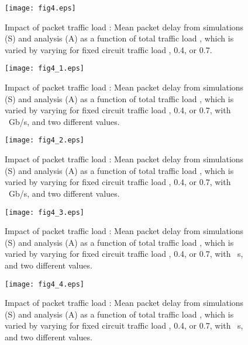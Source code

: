 \documentclass[article]{IEEEtran}
\begin{document}
\begin{figure}[t]
\begin{center}
\texttt{[image: fig4.eps]}
\end{center}
\caption{Impact of packet traffic load :
Mean packet delay  from simulations (S) and
analysis (A) as a function of total traffic load ,
which is varied by varying  for fixed
circuit traffic load , 0.4, or 0.7.}
\label{fig:pi}
\end{figure}
\begin{figure}[t]
\begin{center}
\texttt{[image: fig4\_1.eps]}
\end{center}
\caption{Impact of packet traffic load :
Mean packet delay  from simulations (S) and
analysis (A) as a function of total traffic load ,
which is varied by varying  for fixed
circuit traffic load , 0.4, or 0.7,
with ~Gb/s, and two different  values.}
\label{fig:pi1}
\end{figure}
\begin{figure}[t]
\begin{center}
\texttt{[image: fig4\_2.eps]}
\end{center}
\caption{Impact of packet traffic load :
Mean packet delay  from simulations (S) and
analysis (A) as a function of total traffic load ,
which is varied by varying  for fixed
circuit traffic load , 0.4, or 0.7,
with ~Gb/s, and two different  values.}
\label{fig:pi2}
\end{figure}
\begin{figure}[t]
\begin{center}
\texttt{[image: fig4\_3.eps]}
\end{center}
\caption{Impact of packet traffic load :
Mean packet delay  from simulations (S) and
analysis (A) as a function of total traffic load ,
which is varied by varying  for fixed
circuit traffic load , 0.4, or 0.7,
with ~s, and two different  values.}
\label{fig:pi3}
\end{figure}
\begin{figure}[t]
\begin{center}
\texttt{[image: fig4\_4.eps]}
\end{center}
\caption{Impact of packet traffic load :
Mean packet delay  from simulations (S) and
analysis (A) as a function of total traffic load ,
which is varied by varying  for fixed
circuit traffic load , 0.4, or 0.7,
with ~s, and two different  values.}
\label{fig:pi4}
\end{figure}
\end{document}
